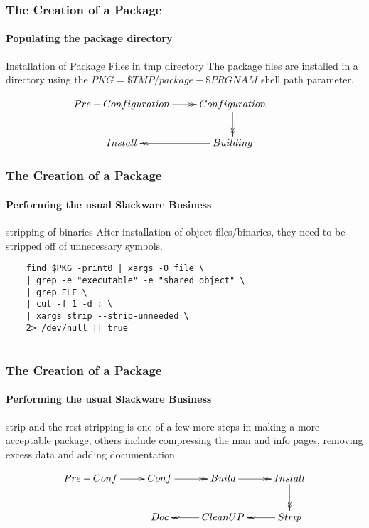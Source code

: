 \documentclass[12pt,hyperref={pdfpagelabels=true}]{beamer}
\begin{document}
\begin{frame}[fragile]
  \frametitle{The Creation of a Package}
  \framesubtitle{Populating the package directory}
  \begin{block}{Installation of Package Files in tmp directory}
    The package files are installed in a directory using the
    $PKG=\$TMP/package-\$PRGNAM$ shell path parameter.
  \end{block}

  
  \begin{equation*}
    \xymatrix@C=2pc@R=2pc{
      Pre-Configuration\ar@{->>}[r] & Configuration\ar@{->>}[d] & \\
      Install & Building\ar@{->>}[l]}
  \end{equation*}
\end{frame}

\begin{frame}[fragile]
  \frametitle{The Creation of a Package}
  \framesubtitle{Performing the usual Slackware Business}
  \begin{block}{stripping of binaries}
    After installation of object files/binaries, they need to be stripped off of
    unnecessary symbols.
  \end{block}
  
  \pause
  
  \begin{lstlisting}
    find $PKG -print0 | xargs -0 file \
    | grep -e "executable" -e "shared object" \
    | grep ELF \
    | cut -f 1 -d : \
    | xargs strip --strip-unneeded \
    2> /dev/null || true
    
  \end{lstlisting}
  
\end{frame}

\begin{frame}
  \frametitle{The Creation of a Package}
  \framesubtitle{Performing the usual Slackware Business}
  
  \begin{block}{strip and the rest}
    stripping is one of a few more steps in making a more acceptable package,
    others include compressing the man and info pages, removing excess data and
    adding documentation
  \end{block}
  
  \pause
  
  \begin{equation*}
    \xymatrix@C=2pc@R=2pc{
      Pre-Conf\ar@{->}[r] & Conf\ar@{->>}[r] &
      Build\ar@{->>}[r] & Install\ar@{->>}[d]\\
      & Doc & CleanUP\ar@{->>}[l] & Strip\ar@{->>}[l]}
  \end{equation*}
  
\end{frame}
\end{document}
